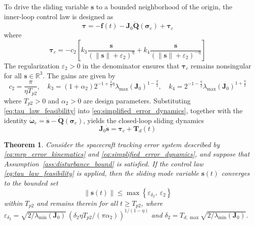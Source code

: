 \documentclass[journal]{new-aiaa}
\newtheorem{theorem}{Theorem}
\begin{document}
To drive the sliding variable $\boldsymbol{s}$ to a bounded neighborhood of the origin, the inner-loop control law is designed as
\begin{equation}
\boldsymbol{\tau} = -\boldsymbol{f}(t) - \boldsymbol{J}_0\dot{\boldsymbol{Q}}(\boldsymbol{\sigma}_e) + \boldsymbol{\tau}_c
\label{eq:tau_law_feasibility}
\end{equation}
where
\begin{equation}
\boldsymbol{\tau}_c = -c_2 \left[
k_3 \frac{\boldsymbol{s}}{(\|\boldsymbol{s}\| + \varepsilon_2)^\eta}
+ k_4 \frac{\boldsymbol{s}}{(\|\boldsymbol{s}\| + \varepsilon_2)^{-\eta}}
\right]
\end{equation}
The regularization $\varepsilon_2>0$ in the denominator ensures that $\boldsymbol{\tau}_c$ remains nonsingular for all $\boldsymbol{s}\in\mathbb{R}^3$. The gains are given by
\begin{equation}
c_2 = \frac{\pi}{\eta T_{p2}}, \quad
k_3 = (1 + \alpha_2) 2^{-1 + \frac{3}{2}\eta} \lambda_{\max}(\boldsymbol{J}_0)^{1 - \frac{\eta}{2}}, \quad
k_4 = 2^{-1 - \frac{\eta}{2}} \lambda_{\max}(\boldsymbol{J}_0)^{1 + \frac{\eta}{2}}
\label{eq:gains_c2k3k4}
\end{equation}
where $T_{p2}>0$ and $\alpha_2>0$ are design parameters.
Substituting \eqref{eq:tau_law_feasibility} into \eqref{eq:simplified_error_dynamics}, together with the identity $\dot{\boldsymbol{\omega}}_e = \dot{\boldsymbol{s}} - \dot{\boldsymbol{Q}}(\boldsymbol{\sigma}_e)$, yields the closed-loop sliding dynamics
\begin{equation}
\boldsymbol{J}_0 \dot{\boldsymbol{s}} = \boldsymbol{\tau}_c + \boldsymbol{T}_d(t)
\label{eqL:closed_dynamics_s}
\end{equation}

\begin{theorem}
\label{thm:sliding_convergence}
Consider the spacecraft tracking error system described by 
\eqref{eq:mrp_error_kinematics} and \eqref{eq:simplified_error_dynamics}, 
and suppose that Assumption~\ref{ass:disturbance_bound} is satisfied. 
If the control law \eqref{eq:tau_law_feasibility} is applied, 
then the sliding mode variable $\boldsymbol{s}(t)$ converges to the bounded set
\begin{equation}
\|\boldsymbol{s}(t)\| \le \max\left\{ \varepsilon_{\delta_2},\ \varepsilon_2 \right\}
\end{equation}
within $T_{p2}$ and remains therein for all $t \ge T_{p2}$, where
$\varepsilon_{\delta_2} = \sqrt{2/\lambda_{\min}(\boldsymbol{J}_0)}\,( \delta_2 \eta T_{p2} / (\pi \alpha_2) )^{1/(1-\eta)}$
and $\delta_2 = T_{d,\max}\sqrt{2/\lambda_{\min}(\boldsymbol{J}_0)}$.
\end{theorem}
\end{document}

